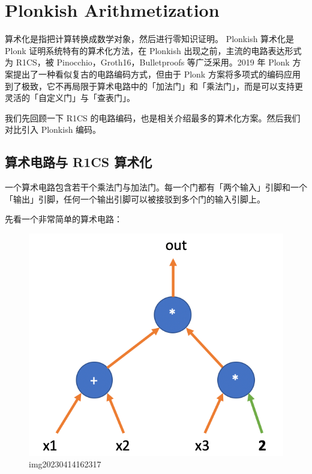 \chapter{Plonkish Arithmetization}\label{ux7406ux89e3-plonkux4e00plonkish-arithmetization}


算术化是指把计算转换成数学对象，然后进行零知识证明。 Plonkish 算术化是
Plonk 证明系统特有的算术化方法，在 Plonkish
出现之前，主流的电路表达形式为 R1CS，被 Pinocchio，Groth16，Bulletproofs
等广泛采用。2019 年 Plonk 方案提出了一种看似复古的电路编码方式，但由于
Plonk
方案将多项式的编码应用到了极致，它不再局限于算术电路中的「加法门」和「乘法门」，而是可以支持更灵活的「自定义门」与「查表门」。

我们先回顾一下 R1CS
的电路编码，也是相关介绍最多的算术化方案。然后我们对比引入 Plonkish
编码。

\hypertarget{ux7b97ux672fux7535ux8defux4e0e-r1cs-ux7b97ux672fux5316}{%
\section{算术电路与 R1CS
算术化}\label{ux7b97ux672fux7535ux8defux4e0e-r1cs-ux7b97ux672fux5316}}

一个算术电路包含若干个乘法门与加法门。每一个门都有「两个输入」引脚和一个「输出」引脚，任何一个输出引脚可以被接驳到多个门的输入引脚上。

先看一个非常简单的算术电路：

\begin{figure}
\centering
\includegraphics{img/img20230414162317.png}
\caption{img20230414162317}
\end{figure}

